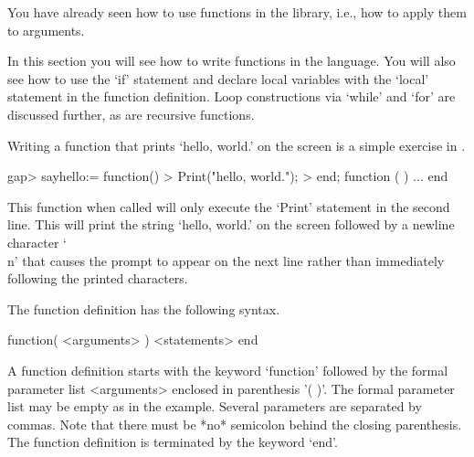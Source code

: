 


You  have already  seen how to   use functions in the {\GAP}  library,
i.e., how to apply them to arguments.

In this section  you will see  how to  write  functions in  the {\GAP}
language.  You will also see how to use the `if' statement and declare
local variables with the `local' statement in the function definition.
Loop constructions via `while' and `for' are discussed further, as are
recursive functions.


Writing a function that prints `hello, world.'  on the screen is a simple
exercise in {\GAP}.

\beginexample
gap> sayhello:= function()
> Print("hello, world.\n");
> end;
function (  ) ... end
\endexample

This function when called will only execute the  `Print' statement in the
second line.  This will  print the string  `hello, world.'  on the screen
followed by a  newline character `\\n' that causes  the {\GAP} prompt  to
appear  on the next  line rather  than  immediately following the printed
characters.

The function definition has the following syntax.

\)\fmark function( <arguments> ) <statements> end

A function definition starts with the keyword `function' followed by
the formal parameter list <arguments> enclosed in parenthesis '( )'.
The formal parameter list may be empty as in the example.  Several
parameters are separated by commas.  Note that there must be *no*
semicolon behind the closing parenthesis.  The function definition is
terminated by the keyword `end'.

